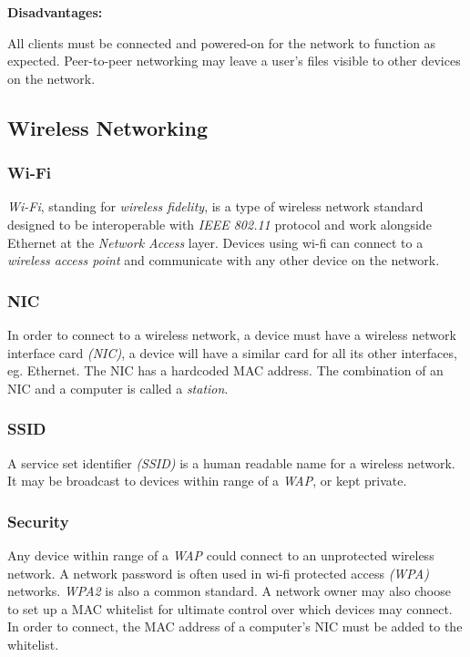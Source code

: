 \documentclass[10pt]{article}
\begin{document}
\textbf{Disadvantages:}

All clients must be connected and powered-on for the network to function as expected. Peer-to-peer networking may leave a user's files visible to other devices on the network.

\subsection{Wireless Networking}
\label{sec:org610a23f}
\subsubsection{Wi-Fi}
\label{sec:orgeb9a610}

\emph{Wi-Fi}, standing for \emph{wireless fidelity}, is a type of wireless network standard designed to be interoperable with \emph{IEEE 802.11} protocol and work alongside Ethernet at the \emph{Network Access} layer. Devices using wi-fi can connect to a \emph{wireless access point} and communicate with any other device on the network.

\subsubsection{NIC}
\label{sec:org16df7a9}

In order to connect to a wireless network, a device must have a wireless network interface card \emph{(NIC)}, a device will have a similar card for all its other interfaces, eg. Ethernet. The NIC has a hardcoded MAC address. The combination of an NIC and a computer is called a \emph{station}.

\subsubsection{SSID}
\label{sec:orgb3aec77}

A service set identifier \emph{(SSID)} is a human readable name for a wireless network. It may be broadcast to devices within range of a \emph{WAP}, or kept private.

\subsubsection{Security}
\label{sec:orge2ce81d}

Any device within range of a \emph{WAP} could connect to an unprotected wireless network. A network password is often used in wi-fi protected access \emph{(WPA)} networks. \emph{WPA2} is also a common standard. A network owner may also choose to set up a MAC whitelist for ultimate control over which devices may connect. In order to connect, the MAC address of a computer's NIC must be added to the whitelist.
\end{document}
